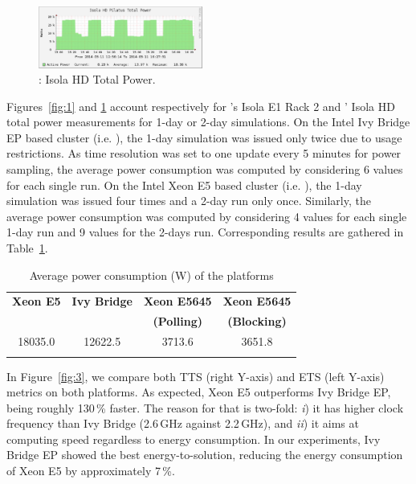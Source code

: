 \begin{figure}[htbf]
  \begin{center}
    \includegraphics[width=0.48\textwidth]{Figs/NRJ_benchmark_Pilatus.eps}
    \caption{\pilat: Isola HD Total Power.}
    \label{fig:2}
  \end{center}
\end{figure}

Figures~\ref{fig:1}   and   \ref{fig:2}   account   respectively   for
\monch's Isola E1 Rack  2 and \pilat' Isola HD total
power measurements for  1-day or 2-day simulations. On  the Intel Ivy
Bridge EP  based cluster (i.e.  \monch),  the 1-day simulation
was issued  only twice due  to usage restrictions. As  time resolution
was set to one update every  5 minutes for power sampling, the average
power consumption was computed by considering 6 values for each single
run.  On the Intel Xeon E5 based cluster (i.e.  \pilat), the
1-day simulation  was issued  four times and  a 2-day run  only once.
Similarly, the average power consumption was computed by considering 4
values  for  each  single  1-day  run  and 9  values  for  the  2-days
run. Corresponding results are gathered in Table~\ref{tab:3}.

\begin{table}[htbf]
  \begin{center}
    \caption{Average power consumption (W) of the platforms}
    \label{tab:3}
    \begin{tabular}{cccc}
      \hline\noalign{\smallskip}
      \textbf{\scriptsize{Xeon E5}} & \textbf{\scriptsize{Ivy Bridge}} & \textbf{\scriptsize{Xeon  E5645}} & \textbf{\scriptsize{Xeon  E5645}}\\
      & & \textbf{\scriptsize{(Polling)}} & \textbf{\scriptsize{(Blocking)}} \\
      \noalign{\smallskip}\hline\noalign{\smallskip}
      18035.0 & 12622.5 & 3713.6 & 3651.8 \\ 
      \noalign{\smallskip}\hline
    \end{tabular}
  \end{center}
\end{table}

In  Figure~\ref{fig:3}, we  compare both  TTS (right  Y-axis)  and ETS
(left  Y-axis)  metrics  on  both  platforms.  As  expected,  Xeon  E5
outperforms Ivy Bridge EP, being  roughly 130\,\% faster.  The reason for
that is  two-fold: \emph{i}) it has  higher clock frequency  than Ivy Bridge
(2.6\,GHz  against  2.2\,GHz),  and  \emph{ii})  it  aims at  computing  speed
regardless to  energy consumption.  In our experiments,  Ivy Bridge EP
showed the best energy-to-solution, reducing the energy consumption of
Xeon E5 by approximately 7\,\%.

